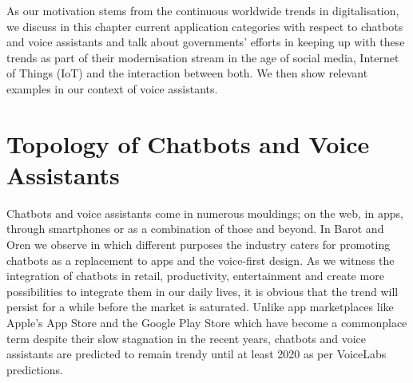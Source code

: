 


As our motivation stems from the %
continuous worldwide trends in digitalisation, we discuss in this chapter current application categories
with respect to chatbots and voice assistants
and talk about governments' efforts in keeping up with these trends as part of their 
modernisation stream
in the age of social media, Internet of Things (IoT) and the interaction between both.
We then show relevant examples in our context of voice assistants.




\section{Topology of Chatbots and Voice Assistants}

Chatbots and voice assistants come in numerous mouldings; on the web, in apps, through smartphones or as a combination of those and beyond. In Barot and Oren \cite{guidetochat} we observe in which different purposes the industry caters for promoting chatbots as a replacement to apps and the voice-first design. As we witness the integration of chatbots in retail, productivity, entertainment and create more possibilities to integrate them in our daily lives, it is obvious that the trend will %
persist for a while before the market is saturated. %
Unlike app marketplaces like Apple's App Store and the Google Play Store which have become a commonplace term despite their slow stagnation in the recent years, chatbots and voice assistants are predicted to remain trendy until at least 2020 as per VoiceLabs predictions. %

